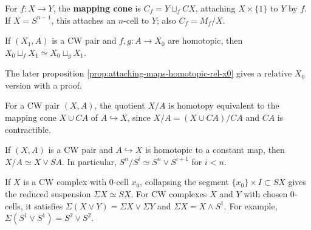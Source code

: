 \begin{definition}
\label{def:mapping-cone}
\leanok
{}
For $f:X\to Y$, the \textbf{mapping cone} is
$C_f=Y\sqcup_f CX$, attaching $X\times\{1\}$ to $Y$ by $f$. If
$X=S^{n-1}$, this attaches an $n$-cell to $Y$; also $C_f=M_f/X$.
\end{definition}

\begin{proposition}
\label{prop:attaching-homotopic-maps-preview}
\leanok
{}
If $(X_1,A)$ is a CW pair and $f,g:A\to X_0$ are homotopic, then
$X_0\sqcup_fX_1\simeq X_0\sqcup_gX_1$.
\end{proposition}

\begin{remark}
\label{rem:attaching-homotopic-maps-sharper-version}
The later proposition \cref{prop:attaching-maps-homotopic-rel-x0} gives a relative
$X_0$ version with a proof.
\end{remark}

\begin{example}
\label{ex:quotient-contractible-subcomplex-mapping-cone}
For a CW pair $(X,A)$, the quotient $X/A$ is homotopy equivalent to the mapping cone
$X\cup CA$ of $A\hookrightarrow X$, since
$X/A=(X\cup CA)/CA$ and $CA$ is contractible.
\end{example}

\begin{example}
\label{ex:quotient-by-contractible-in-x}
If $(X,A)$ is a CW pair and $A\hookrightarrow X$ is homotopic to a constant map, then
$X/A\simeq X\vee SA$. In particular, $S^n/S^i\simeq S^n\vee S^{i+1}$ for $i<n$.
\end{example}

\begin{example}
\label{ex:reduced-suspension}
If $X$ is a CW complex with 0-cell $x_0$, collapsing the segment
$\{x_0\}\times I\subset SX$ gives the reduced suspension $\Sigma X\simeq SX$.
For CW complexes $X$ and $Y$ with chosen $0$-cells, it satisfies
$\Sigma(X\vee Y)=\Sigma X\vee\Sigma Y$ and $\Sigma X=X\wedge S^1$.
For example, $\Sigma(S^1\vee S^1)=S^2\vee S^2$.
\end{example}


